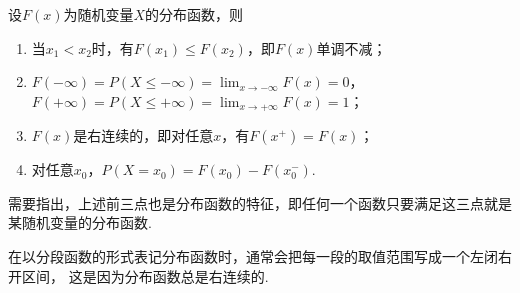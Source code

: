 \begin{property}
设\(F(x)\)为随机变量\(X\)的分布函数，则
\begin{enumerate}
	\item 当\(x_1 < x_2\)时，有\(F(x_1) \leq F(x_2)\)，即\(F(x)\)单调不减；
	\item \(F(-\infty)=P(X \leq -\infty) = \lim_{x \to -\infty}{F(x)} = 0\)，
	\(F(+\infty)=P(X \leq +\infty) = \lim_{x \to +\infty}{F(x)} = 1\)；
	\item \(F(x)\)是右连续的，即对任意\(x\)，有\(F(x^+)=F(x)\)；
	\item 对任意\(x_0\)，\(P(X=x_0)=F(x_0)-F(x_0^-)\).
\end{enumerate}
\end{property}
需要指出，上述前三点也是分布函数的特征，即任何一个函数只要满足这三点就是某随机变量的分布函数.

在以分段函数的形式表记分布函数时，通常会把每一段的取值范围写成一个左闭右开区间，
这是因为分布函数总是右连续的.
